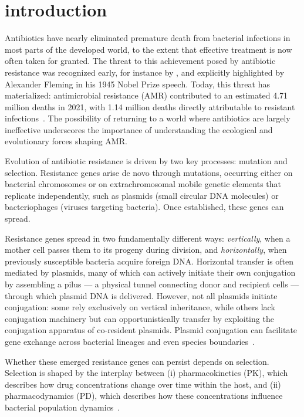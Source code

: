 \documentclass[../main.tex]{subfiles}
\begin{document}
\chapter{introduction}
Antibiotics have nearly eliminated premature death from bacterial infections in most parts of the developed world, to the extent that effective treatment is now often taken for granted.
The threat to this achievement posed by antibiotic resistance was recognized early, for instance by \cite{Kirby1944}, and explicitly highlighted by Alexander Fleming in his 1945 Nobel Prize speech.
Today, this threat has materialized: antimicrobial resistance (AMR) contributed to an estimated 4.71 million deaths in 2021, with 1.14 million deaths directly attributable to resistant infections~\cite{Naghavi2024}.
The possibility of returning to a world where antibiotics are largely ineffective underscores the importance of understanding the ecological and evolutionary forces shaping AMR.

Evolution of antibiotic resistance is driven by two key processes: mutation and selection. Resistance genes arise de novo through mutations, occurring either on bacterial chromosomes or on extrachromosomal mobile genetic elements that replicate independently, such as plasmids (small circular DNA molecules) or bacteriophages (viruses targeting bacteria). Once established, these genes can spread.

Resistance genes spread in two fundamentally different ways: \emph{vertically}, when a mother cell passes them to its progeny during division, and \emph{horizontally}, when previously susceptible bacteria acquire foreign DNA.
Horizontal transfer is often mediated by plasmids, many of which can actively initiate their own conjugation by assembling a pilus --- a physical tunnel connecting donor and recipient cells --- through which plasmid DNA is delivered.
However, not all plasmids initiate conjugation: some rely exclusively on vertical inheritance, while others lack conjugation machinery but can opportunistically transfer by exploiting the conjugation apparatus of co-resident plasmids.
Plasmid conjugation can facilitate gene exchange across bacterial lineages and even species boundaries~\cite{Bates1998}.

Whether these emerged resistance genes can persist depends on selection.
Selection is shaped by the interplay between (i) pharmacokinetics (PK), which describes how drug concentrations change over time within the host, and (ii) pharmacodynamics (PD), which describes how these concentrations influence bacterial population dynamics~\cite{Regoes2004}.
\end{document}
